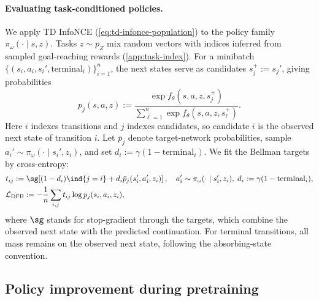 \paragraph{Evaluating task-conditioned policies.}
We apply TD InfoNCE (\cref{eq:td-infonce-population}) to the policy family $\pi_\omega(\cdot\mid s,z)$.
Tasks $z\sim p_Z$ mix random vectors with indices inferred from sampled goal-reaching rewards (\cref{app:task-index}).
For a minibatch $\{(s_i,a_i,s_i',\mathrm{terminal}_i)\}_{i=1}^n$, the next states serve as candidates $s_j^+:=s_j'$, giving probabilities
\begin{equation}
    p_j(s,a,z) :=\frac{\exp f_\theta(s,a,z,s_j^+)} {\sum_{\ell=1}^n\exp f_\theta(s,a,z,s_\ell^+)}.
    \label{eq:density-candidates}
\end{equation}
Here $i$ indexes transitions and $j$ indexes candidates, so candidate $i$ is the observed next state of transition $i$.
Let $\bar p_j$ denote target-network probabilities, sample $a_i'\sim\pi_\omega(\cdot\mid s_i',z_i)$,
and set $d_i:=\gamma(1-\mathrm{terminal}_i)$.
We fit the Bellman targets by cross-entropy:
\begin{align}
    &t_{ij} :=\sg\!\left[(1-d_i)\ind{j=i}+d_i\bar p_j(s_i',a_i',z_i)\right], \quad a_i'\sim\pi_\omega(\cdot\mid s_i',z_i), \; d_i:=\gamma(1-\mathrm{terminal}_i), \nonumber\\
    &\mathcal L_{\mathrm{DFB}} :=-\frac1n\sum_{i,j}t_{ij}\log p_j(s_i,a_i,z_i),
    \label{eq:density-loss}
\end{align}
where $\sg$ stands for stop-gradient through the targets, which combine the observed next state with the predicted continuation.
For terminal transitions, all mass remains on the observed next state, following the absorbing-state convention.


\subsection{Policy improvement during pretraining}
\label{sec:method-policy}

